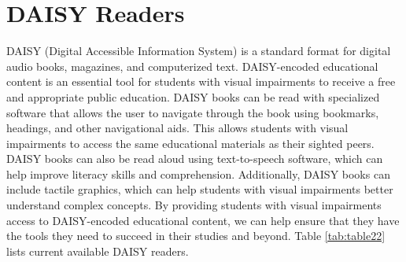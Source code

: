 \documentclass[14pt,letterpaper,twoside]{extreport}
\begin{document}
\hypertarget{text-to-speech-music-podcast}{}\section{DAISY Readers}\label{text-to-speech-music-podcast}
DAISY (Digital Accessible Information System) is a standard format for digital audio books, magazines, and computerized text. DAISY-encoded educational content is an essential tool for students with visual impairments to receive a free and appropriate public education. DAISY books can be read with specialized software that allows the user to navigate through the book using bookmarks, headings, and other navigational aids. This allows students with visual impairments to access the same educational materials as their sighted peers. DAISY books can also be read aloud using text-to-speech software, which can help improve literacy skills and comprehension. Additionally, DAISY books can include tactile graphics, which can help students with visual impairments better understand complex concepts. By providing students with visual impairments access to DAISY-encoded educational content, we can help ensure that they have the tools they need to succeed in their studies and beyond. Table \ref{tab:table22} lists current available DAISY readers. 
\end{document}
